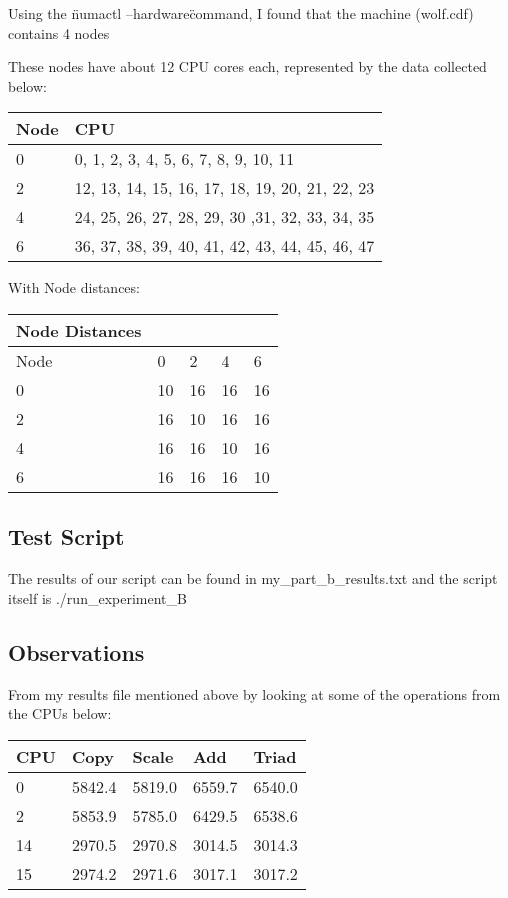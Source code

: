 \documentclass{article}
\begin{document}
Using the \"numactl --hardware\" command, I found that the machine (wolf.cdf) contains 4 nodes 

These nodes have about 12 CPU cores each, represented by the data collected below:

\begin{center}
\begin{tabular}{|l|l|}
  \hline
  Node & CPU \\ \hline
  0 & 0, 1, 2, 3, 4, 5, 6, 7, 8, 9, 10, 11 \\ \hline
  2 & 12, 13, 14, 15, 16, 17, 18, 19, 20, 21, 22, 23 \\ \hline
  4 & 24, 25, 26, 27, 28, 29, 30 ,31, 32, 33, 34, 35 \\ \hline
  6 & 36, 37, 38, 39, 40, 41, 42, 43, 44, 45, 46, 47 \\ \hline
\end{tabular}
\end{center}

With Node distances:

\begin{center}
\begin{tabular}{|l|l|l|l|l|}
	\hline
	Node Distances \\ \hline
	Node & 0 & 2 & 4 & 6 \\ \hline
  	0 & 10 & 16 & 16 & 16 \\ \hline
  	2 & 16 & 10 & 16 & 16 \\ \hline
  	4 & 16 & 16 & 10 & 16 \\ \hline
  	6 & 16 & 16 & 16 & 10 \\ \hline

\end{tabular}
\end{center}



\subsection{Test Script}

The results of our script can be found in my\_part\_b\_results.txt and the script itself is ./run_experiment\_B

\subsection{Observations}

From my results file mentioned above by looking at some of the operations from the CPUs below:

\begin{center}
\begin{tabular}{|l|l|l|l|l|}
	\hline 
	CPU & Copy & Scale & Add & Triad \\ \hline
	0 & 5842.4 & 5819.0 & 6559.7 & 6540.0 \\ \hline
	2 & 5853.9 & 5785.0 & 6429.5 & 6538.6 \\ \hline
	14 & 2970.5 & 2970.8 & 3014.5 & 3014.3 \\ \hline
	15 & 2974.2 & 2971.6 & 3017.1 & 3017.2 \\ \hline
\end{tabular}
\end{center}
\end{document}
